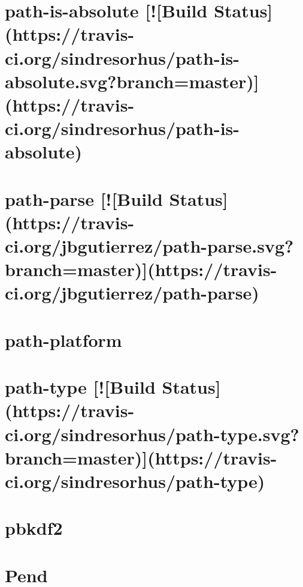 \documentclass[twoside]{book}
\newcommand{\+}{\discretionary{\mbox{\scriptsize$\hookleftarrow$}}{}{}}
\begin{document}
\chapter{path-\/is-\/absolute \mbox{[}!\mbox{[}Build Status\mbox{]}(https\+://travis-\/ci.org/sindresorhus/path-\/is-\/absolute.svg?branch=master)\mbox{]}(https\+://travis-\/ci.org/sindresorhus/path-\/is-\/absolute)}
\label{md_dsmacc_examples_DRmerge_node_modules_path-is-absolute_readme}

\chapter{path-\/parse \mbox{[}!\mbox{[}Build Status\mbox{]}(https\+://travis-\/ci.org/jbgutierrez/path-\/parse.svg?branch=master)\mbox{]}(https\+://travis-\/ci.org/jbgutierrez/path-\/parse)}
\label{md_dsmacc_examples_DRmerge_node_modules_path-parse_README}

\chapter{path-\/platform}
\label{md_dsmacc_examples_DRmerge_node_modules_path-platform_README}

\chapter{path-\/type \mbox{[}!\mbox{[}Build Status\mbox{]}(https\+://travis-\/ci.org/sindresorhus/path-\/type.svg?branch=master)\mbox{]}(https\+://travis-\/ci.org/sindresorhus/path-\/type)}
\label{md_dsmacc_examples_DRmerge_node_modules_path-type_readme}

\chapter{pbkdf2}
\label{md_dsmacc_examples_DRmerge_node_modules_pbkdf2_README}

\chapter{Pend}
\label{md_dsmacc_examples_DRmerge_node_modules_pend_README}

\end{document}
